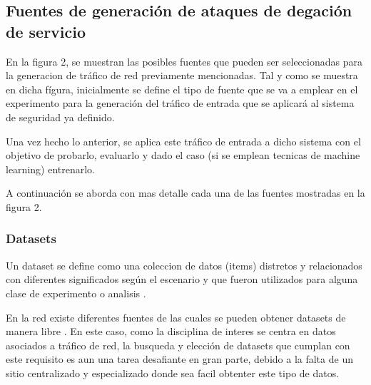 \documentclass[12pt]{article}
\begin{document}
\subsection{Fuentes de generación de ataques de degación de servicio}

En la figura 2, se muestran las posibles fuentes que pueden ser
seleccionadas para la generacion de tráfico de red previamente
mencionadas. Tal y como se muestra en dicha fígura, inicialmente se
define el tipo de fuente que se va a emplear en el experimento para la
generación del tráfico de entrada que se aplicará al sistema de
seguridad ya definido.

Una vez hecho lo anterior, se aplica este tráfico de entrada a dicho
sistema con el objetivo de probarlo, evaluarlo y dado el caso (si se
emplean tecnicas de machine learning) entrenarlo.

A continuación se aborda con mas detalle cada una de las fuentes
mostradas en la figura 2.

\subsubsection{Datasets} 

Un dataset se define como una coleccion de datos (items) distretos y
relacionados con diferentes significados según el escenario y que
fueron utilizados para alguna clase de experimento o analisis
\citep{datasets_availability}.

En la red existe diferentes fuentes de las cuales se pueden obtener
datasets de manera libre \citep{UCI, kaggle,
  awesome_public_datasets}. En este caso, como la disciplina de
interes se centra en datos asociados a tráfico de red, la busqueda y
elección de datasets que cumplan con este requisito es aun una tarea
desafiante en gran parte, debido a la falta de un sitio centralizado y
especializado donde sea facil obtenter este tipo de datos.
\end{document}

